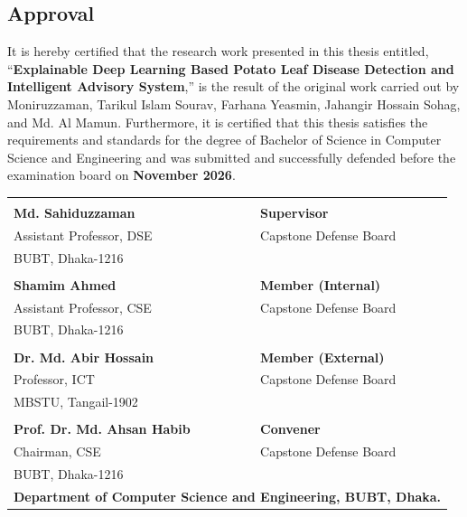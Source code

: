 \begin{center}
    \section*{Approval}
\end{center}

\noindent
It is hereby certified that the research work presented in this thesis entitled, ``\textbf{Explainable Deep Learning Based Potato Leaf Disease Detection and Intelligent Advisory System},'' is the result of the original work carried out by Moniruzzaman, Tarikul Islam Sourav, Farhana Yeasmin, Jahangir Hossain Sohag, and Md. Al Mamun. Furthermore, it is certified that this thesis satisfies the requirements and standards for the degree of Bachelor of Science in Computer Science and Engineering and was submitted and successfully defended before the examination board on \textbf{November 2026}.

\vspace{6mm}

\begin{table}[!h]
\centering
\renewcommand{\arraystretch}{1.7}

\begin{tabular*}{\textwidth}{@{\extracolsep{\fill}} p{} >{\raggedleft\arraybackslash}p{}}

\underline{\hspace{6cm}} &
\\[-0.1cm]
\textbf{Md. Sahiduzzaman} &
\textbf{Supervisor} \\
Assistant Professor, DSE &
Capstone Defense Board \\
BUBT, Dhaka-1216 &
\\[0.8cm]

\underline{\hspace{6cm}} &
\\[-0.1cm]
\textbf{Shamim Ahmed} &
\textbf{Member (Internal)} \\
Assistant Professor, CSE &
Capstone Defense Board \\
BUBT, Dhaka-1216 &
\\[0.8cm]

\underline{\hspace{6cm}} &
\\[-0.1cm]
\textbf{Dr. Md. Abir Hossain} &
\textbf{Member (External)} \\
Professor, ICT &
Capstone Defense Board \\
MBSTU, Tangail-1902 &
\\[0.8cm]

\underline{\hspace{6cm}} &
\\[-0.1cm]
\textbf{Prof. Dr. Md. Ahsan Habib} &
\textbf{Convener} \\
Chairman, CSE &
Capstone Defense Board \\
BUBT, Dhaka-1216 &
\\[1cm]

\multicolumn{2}{c}{\textbf{Department of Computer Science and Engineering, BUBT, Dhaka.}}\\
\end{tabular*}
\end{table}

